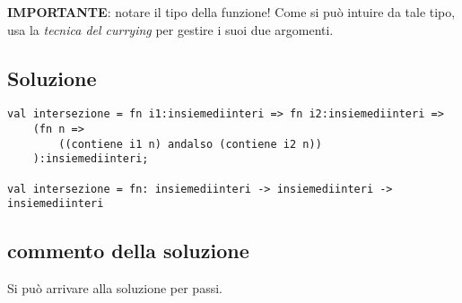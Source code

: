 \textbf{IMPORTANTE}: notare il tipo della funzione! Come si può intuire da tale tipo, usa la \emph{tecnica del currying} per gestire i suoi due argomenti.

\subsection{Soluzione}

\begin{lstlisting}[style = SML, caption = {Definizione della funzione \sml{intersezione}}]
val intersezione = fn i1:insiemediinteri => fn i2:insiemediinteri =>
	(fn n =>
		((contiene i1 n) andalso (contiene i2 n))
	):insiemediinteri;

val intersezione = fn: insiemediinteri -> insiemediinteri -> insiemediinteri
\end{lstlisting}

\subsection{commento della soluzione}

Si può arrivare alla soluzione per passi.

